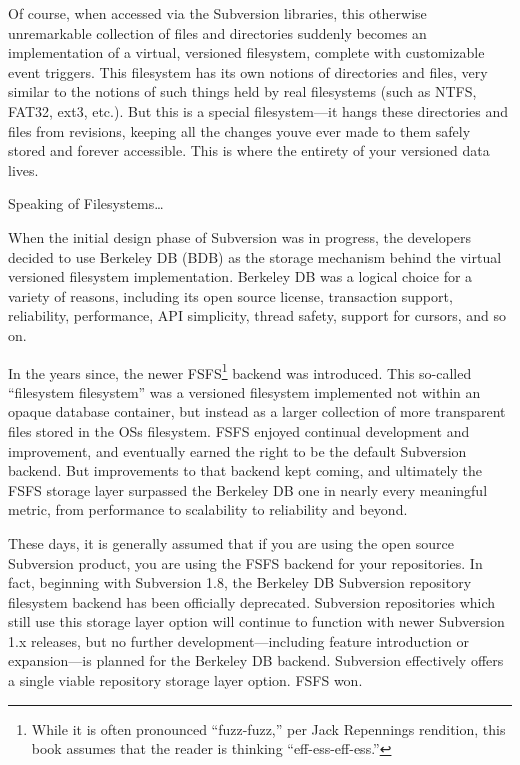 Of course, when accessed via the Subversion libraries, this otherwise
unremarkable collection of files and directories suddenly becomes an
implementation of a virtual, versioned filesystem, complete with
customizable event triggers. This filesystem has its own notions of
directories and files, very similar to the notions of such things held
by real filesystems (such as NTFS, FAT32, ext3, etc.). But this is a
special filesystem---it hangs these directories and files from
revisions, keeping all the changes you\textquotesingle ve ever made to
them safely stored and forever accessible. This is where the entirety of
your versioned data lives.

\protect{}\label{svn.reposadmin.basics.backends}
Speaking of Filesystems\ldots{}

When the initial design phase of Subversion was in progress, the
developers decided to use Berkeley DB (BDB) as the storage mechanism
behind the virtual versioned filesystem implementation. Berkeley DB was
a logical choice for a variety of reasons, including its open source
license, transaction support, reliability, performance, API simplicity,
thread safety, support for cursors, and so on.

In the years since, the newer FSFS\footnote{While it is often pronounced
  ``fuzz-fuzz,'' per Jack Repenning\textquotesingle s rendition, this
  book assumes that the reader is thinking ``eff-ess-eff-ess.''} backend
was introduced. This so-called ``filesystem filesystem'' was a versioned
filesystem implemented not within an opaque database container, but
instead as a larger collection of more transparent files stored in the
OS\textquotesingle s filesystem. FSFS enjoyed continual development and
improvement, and eventually earned the right to be the default
Subversion backend. But improvements to that backend kept coming, and
ultimately the FSFS storage layer surpassed the Berkeley DB one in
nearly every meaningful metric, from performance to scalability to
reliability and beyond.

These days, it is generally assumed that if you are using the open
source Subversion product, you are using the FSFS backend for your
repositories. In fact, beginning with Subversion 1.8, the Berkeley DB
Subversion repository filesystem backend has been officially deprecated.
Subversion repositories which still use this storage layer option will
continue to function with newer Subversion 1.x releases, but no further
development---including feature introduction or expansion---is planned
for the Berkeley DB backend. Subversion effectively offers a single
viable repository storage layer option. FSFS won.

